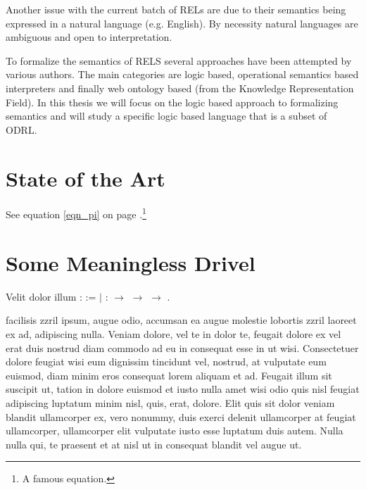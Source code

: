Another issue with the current batch of RELs are due to their semantics being expressed in a natural language (e.g. English). By necessity natural languages are ambiguous and open to interpretation. 

To formalize the semantics of RELS several approaches have been attempted by various authors. The main categories are logic based, operational semantics based interpreters and finally web ontology based (from the Knowledge Representation Field). In this thesis we will focus on the logic based approach to formalizing semantics and will study a specific logic based language that is a subset of ODRL.







\section{State of the Art}

See equation \ref{eqn_pi} on page \pageref{eqn_pi}.\footnote{A famous equation.}

\section{Some Meaningless Drivel}


Velit dolor illum 
\coqdoceol
\coqdocemptyline
\coqdocnoindent
{}  :  :=\coqdoceol
\coqdocindent{1.00em}
\ensuremath{|}  :  \ensuremath{\rightarrow}  \ensuremath{\rightarrow}  \ensuremath{\rightarrow} .\coqdoceol
\coqdocemptyline
\coqdocemptyline




facilisis zzril ipsum, augue odio, accumsan ea augue molestie lobortis zzril laoreet ex ad, adipiscing nulla. Veniam dolore, vel te in dolor te, feugait dolore ex vel erat duis nostrud diam commodo ad eu in consequat esse in ut wisi. Consectetuer dolore feugiat wisi eum dignissim tincidunt vel, nostrud, at vulputate eum euismod, diam minim eros consequat lorem aliquam et ad. Feugait illum sit suscipit ut, tation in dolore euismod et iusto nulla amet wisi odio quis nisl feugiat adipiscing luptatum minim nisl, quis, erat, dolore. Elit quis sit dolor veniam blandit ullamcorper ex, vero nonummy, duis exerci delenit ullamcorper at feugiat ullamcorper, ullamcorper elit vulputate iusto esse luptatum duis autem. Nulla nulla qui, te praesent et at nisl ut in consequat blandit vel augue ut.

